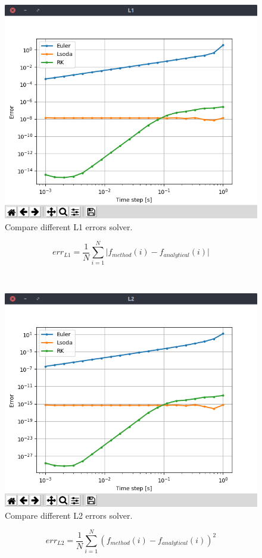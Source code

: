 \documentclass{cmc}
\begin{document}
\begin{minipage}[t]{0.49\textwidth}
	\begin{figure}[H]
		\centering
  		\includegraphics[width=\textwidth,trim={0 1.25cm 0 0},clip]{figures/ex1_L1_errors.png}
  		\caption{Compare different L1 errors solver.}
  		\label{fig:ex1_L1_errors}
	\end{figure}

	$$err_{L1} = \frac{1}{N} \sum_{i=1}^N \lvert f_{method}(i) - f_{analytical}(i) \rvert$$
\end{minipage}
~
\begin{minipage}[t]{0.49\textwidth}
	\begin{figure}[H]
  		\centering
  		\includegraphics[width=\textwidth,trim={0 1.25cm 0 0},clip]{figures/ex1_L2_errors.png}
  		\caption{Compare different L2 errors solver.}
  		\label{fig:ex1_L2_errors}
	\end{figure}

	$$err_{L2} = \frac{1}{N} \sum_{i=1}^N \left( f_{method}(i) - f_{analytical}(i) \right)^2$$
\end{minipage}
\end{document}
